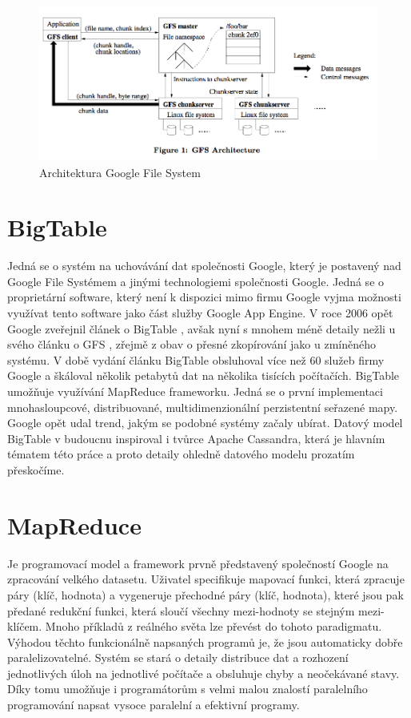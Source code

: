 \begin{figure}[h]
\centering
\includegraphics[scale=0.5]{images/gfs}
\caption{Architektura Google File System \cite{gfs}}
\label{fig:gfs}
\end{figure}

\section{BigTable}
Jedná se o systém na uchovávání dat společnosti Google, který je postavený nad Google File Systémem a jinými technologiemi společnosti Google. Jedná se o proprietární software, který není k dispozici mimo firmu Google vyjma možnosti využívat tento software jako část služby Google App Engine. V roce 2006 opět Google zveřejnil článek o BigTable \cite{bigtable}, avšak nyní s mnohem méně detaily nežli u svého článku o GFS \cite{gfs}, zřejmě z obav o přesné zkopírování jako u zmíněného systému. V době vydání článku BigTable obsluhoval více než 60 služeb firmy Google a škáloval několik petabytů dat na několika tisících počítačích. BigTable umožňuje využívání MapReduce frameworku. Jedná se o první implementaci mnohasloupcové, distribuované, multidimenzionální perzistentní seřazené mapy. Google opět udal trend, jakým se podobné systémy začaly ubírat. Datový model BigTable v budoucnu inspiroval i tvůrce Apache Cassandra, která je hlavním tématem této práce a proto detaily ohledně datového modelu prozatím přeskočíme.

\section{MapReduce}
Je programovací model a framework prvně představený společností Google \cite{mapreduce} na zpracování velkého datasetu. Uživatel specifikuje mapovací funkci, která zpracuje páry (klíč, hodnota) a vygeneruje přechodné páry (klíč, hodnota), které jsou pak předané redukční funkci, která sloučí všechny mezi-hodnoty se stejným mezi-klíčem. Mnoho příkladů z reálného světa lze převést do tohoto paradigmatu. Výhodou těchto funkcionálně napsaných programů je, že jsou automaticky dobře paralelizovatelné. Systém se stará o detaily distribuce dat a rozhození jednotlivých úloh na jednotlivé počítače a obsluhuje chyby a neočekávané stavy. Díky tomu umožňuje i programátorům s velmi malou znalostí paralelního programování napsat vysoce paralelní a efektivní programy. 

